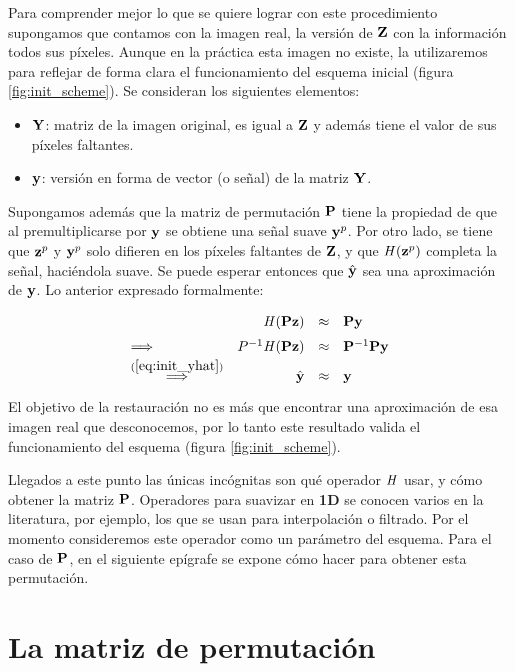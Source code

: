 Para comprender mejor lo que se quiere lograr con este procedimiento supongamos que contamos con la imagen real, la versi\'on de $\Z$ con la informaci\'on todos sus p\'ixeles. Aunque en la pr\'actica esta imagen no existe, la utilizaremos para reflejar de forma clara el funcionamiento del esquema inicial (figura \ref{fig:init_scheme}). Se consideran los siguientes elementos:
\begin{itemize}
	\item $\Y$: matriz de la imagen original, es igual a $\Z$ y adem\'as tiene el valor de sus p\'ixeles faltantes. 
	\item $\y$: versión en forma de vector (o señal) de la matriz $\Y$.
\end{itemize}
Supongamos adem\'as que la matriz de permutaci\'on $\P$ tiene la propiedad de que al premultiplicarse por $\y$ se obtiene una señal suave $\y^p$. Por otro lado, se tiene que $\z^p$ y $\y^p$ solo difieren en los p\'ixeles faltantes de $\Z$, y que $\H(\z^p)$ completa la señal, haciéndola suave. Se puede esperar entonces que $\yhat$ sea una aproximaci\'on de $\y$. Lo anterior expresado formalmente:
\begin{equation}
	\def\arraystretch{1.5}
	\begin{array}{lrcl}
		                                       &     \H (\P\z ) &\approx& \P\y        \\ 
		\Longrightarrow                        & P^{-1}\H(\P\z) &\approx& \P^{-1}\P\y \\
		\overset{(\ref{eq:init_yhat})}{\Longrightarrow} & \yhat &\approx& \y          \\
	\end{array}
	\label{eq:permutation_smoothness}
\end{equation}
El objetivo de la restauraci\'on no es m\'as que encontrar una aproximaci\'on de esa imagen real que desconocemos, por lo tanto este resultado valida el funcionamiento del esquema (figura \ref{fig:init_scheme}).

Llegados a este punto las únicas incógnitas son qu\'e operador $\H$ usar, y c\'omo obtener la matriz $\P$. Operadores para suavizar en \textbf{1D} se conocen varios en la literatura, por ejemplo, los que se usan para interpolaci\'on o filtrado. Por el momento consideremos este operador como un par\'ametro del esquema. Para el caso de $\P$, en el siguiente ep\'igrafe se expone c\'omo hacer para obtener esta permutaci\'on.

\section{La matriz de permutaci\'on}

